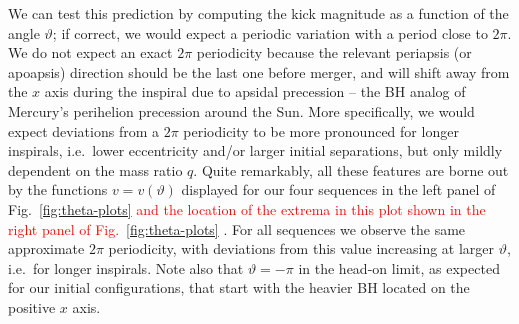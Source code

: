 \documentclass[floats,floatfix,showpacs,amssymb,prd,twocolumn,superscriptaddress,nofootinbib,nolongbibliography,reprint]{revtex4-2}
\newcommand{\mr}[1]{{\textcolor{cyan}{\sf{[MR: #1]}} }}
\newcommand{\new}[1]{{\textcolor{red}{ #1} }}
\begin{document}
We can test this prediction by computing the kick magnitude
as a function of the angle $\vartheta$; if correct, we would
expect a periodic variation with a period close to $2\pi$.
We do not expect an exact $2\pi$ periodicity because the
relevant periapsis (or apoapsis) direction should be the last one before merger,
and will shift away from the $x$ axis during the inspiral
due to 
apsidal precession -- the BH analog
of Mercury's perihelion precession around the Sun. More
specifically, we would expect deviations from a $2\pi$ periodicity
to be more pronounced for longer inspirals, i.e.~lower eccentricity
and/or larger initial separations, but only mildly
dependent on the mass ratio $q$.
Quite remarkably, all these
features are borne out by the functions $v = v(\vartheta)$
displayed for our four sequences in the left panel of 
Fig.~\ref{fig:theta-plots}
\new{ and the location of the extrema in this plot shown in 
the right panel of Fig.~\ref{fig:theta-plots}}.
For all sequences we observe the same approximate $2\pi$ periodicity,
with deviations from this value increasing at larger
$\vartheta$, i.e.~for longer inspirals.
Note also that $\vartheta=-\pi$ in the head-on limit, as expected
for our initial configurations, that start with the heavier BH
located on the positive $x$ axis.
\end{document}
